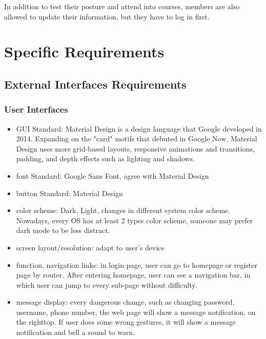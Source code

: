 \documentclass[16pt]{scrreprt}
\begin{document}
 
In addition to test their posture and attend into courses, members are also allowed to update their information, but they have to log in first.\\


\chapter{Specific Requirements}
\label{Specific Requirements}
\section{External Interfaces Requirements}
\subsection{User Interfaces}
\begin{itemize}
    \item GUI Standard: Material Design is a design language that Google developed in 2014. Expanding on the "card" motifs that debuted in Google Now, Material Design uses more grid-based layouts, responsive animations and transitions, padding, and depth effects such as lighting and shadows.
    \item font Standard: Google Sans Font, agree with Material Design
    \item button Standard: Material Design
    \item color scheme: Dark, Light, changes in different system color scheme. Nowadays, every OS has at least 2 types color scheme, someone may prefer dark mode to be less distract.
    \item screen layout/resolution: adapt to user's device
    \item function, navigation links: in login page, user can go to homepage or register page by router. After entering homepage, user can see a navigation bar, in which user can jump to every sub-page without difficulty.
    \item message display: every dangerous change, such as changing password, username, phone number, the web page will show a message notification, on the righttop. If user does some wrong gestures, it will show a message notification and bell a sound to warn.
\end{itemize}
\end{document}
